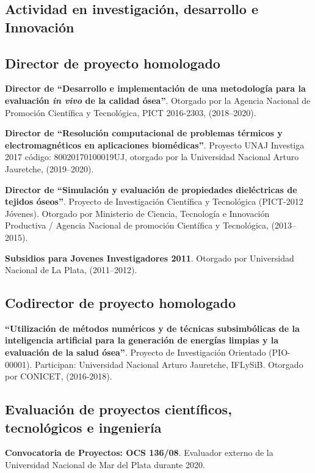 \documentclass[margin,line]{res}
\begin{document}
\begin{resume}
\section{ Actividad en investigación, desarrollo e Innovación}
\vspace*{-.2in}

\subsection{ Director de proyecto homologado}

\textbf{Director de ``Desarrollo e implementación de una metodología para la evaluación \textit{in vivo} de la calidad ósea''}. Otorgado por la Agencia Nacional de Promoción Científica y Tecnológica, PICT 2016-2303, (2018--2020).

\textbf{Director de ``Resolución computacional de problemas térmicos y electromagnéticos en aplicaciones biomédicas''}. Proyecto UNAJ Investiga 2017 código: 80020170100019UJ, otorgado por la Universidad Nacional Arturo Jauretche, (2019--2020).

\textbf{Director de ``Simulación y evaluación de propiedades dieléctricas de tejidos óseos''}. Proyecto de Investigación Científica y Tecnológica (PICT-2012 Jóvenes). Otorgado por Ministerio de Ciencia, Tecnología e Innovación Productiva / Agencia Nacional de promoción Científica y Tecnológica, (2013--2015).

\textbf{Subsidios para Jovenes Investigadores 2011}. Otorgado por Universidad Nacional de La Plata, (2011--2012).

\subsection{ Codirector de proyecto homologado}

\textbf{``Utilización de métodos numéricos y de técnicas subsimbólicas de la inteligencia artificial para la generación de energías  limpias y la evaluación de la salud ósea''}. Proyecto de Investigación Orientado (PIO-00001). Participan: Universidad Nacional Arturo Jauretche, IFLySiB. Otorgado por CONICET, (2016-2018).

\subsection{ Evaluación de proyectos científicos, tecnológicos e ingeniería}

{\bf Convocatoria de Proyectos: OCS 136/08}. Evaluador externo de la Universidad Nacional de Mar del Plata durante 2020.


\end{resume}
\end{document}
